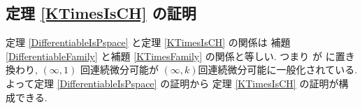 \subsection{定理 \ref{KTimesIsCH} の証明}

定理 \ref{DifferentiableIsPspace} と定理 \ref{KTimesIsCH} の関係は
補題 \ref{DifferentiableFamily} と補題 \ref{KTimesFamily} の関係と等しい.
つまり \PSPACE が \DIVPlog に置き換わり,
$(\infty, 1)$ 回連続微分可能が $(\infty, k)$回連続微分可能に一般化されている.
よって定理 \ref{DifferentiableIsPspace} の証明から
定理 \ref{KTimesIsCH} の証明が構成できる.

